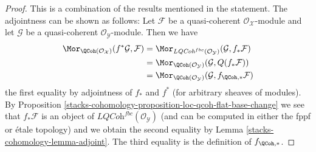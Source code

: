 \begin{proof}
This is a combination of the results mentioned in the statement.
The adjointness can be shown as follows: Let $\mathcal{F}$
be a quasi-coherent $\mathcal{O}_\mathcal{X}$-module and let
$\mathcal{G}$ be a quasi-coherent $\mathcal{O}_\mathcal{Y}$-module.
Then we have
\begin{align*}
\Mor_{\QCoh(\mathcal{O}_\mathcal{X})}(f^*\mathcal{G}, \mathcal{F})
& =
\Mor_{\textit{LQCoh}^{fbc}(\mathcal{O}_\mathcal{Y})}
(\mathcal{G}, f_*\mathcal{F}) \\
& =
\Mor_{\QCoh(\mathcal{O}_\mathcal{Y})}(\mathcal{G}, Q(f_*\mathcal{F}))
\\
& =
\Mor_{\QCoh(\mathcal{O}_\mathcal{Y})}(\mathcal{G},
f_{\QCoh, *}\mathcal{F})
\end{align*}
the first equality by adjointness of $f_*$ and $f^*$ (for arbitrary sheaves
of modules). By
Proposition \ref{stacks-cohomology-proposition-loc-qcoh-flat-base-change}
we see that $f_*\mathcal{F}$ is an object of
$\textit{LQCoh}^{fbc}(\mathcal{O}_\mathcal{Y})$
(and can be computed in either the fppf or \'etale topology) and we
obtain the second equality by Lemma \ref{stacks-cohomology-lemma-adjoint}. The third
equality is the definition of $f_{\QCoh, *}$.


\end{proof}
